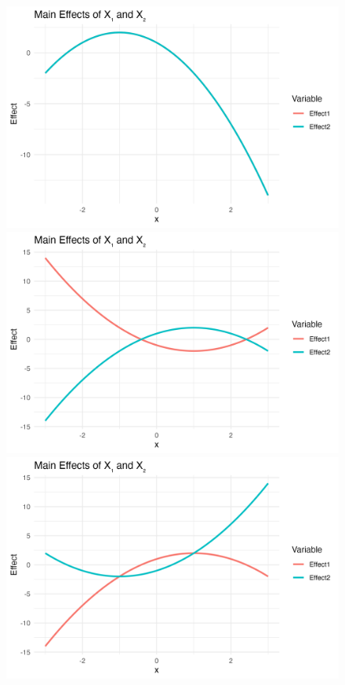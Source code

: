 \begin{figure}[htpb]
    \centering
    \begin{minipage}[t]{0.49\textwidth}
        \centering
        \includegraphics[width=\textwidth]{images/mixed_a1m20_a2m20_a11m10_a22m10_a12p00_rhop00_main.png}
    \end{minipage}
    \hfill
    \begin{minipage}[t]{0.49\textwidth}
        \centering
        \includegraphics[width=\textwidth]{images/mixed_a1m20_a2p20_a11p10_a22m10_a12p00_rhop00_main.png}
    \end{minipage}
    \hfill
    \begin{minipage}[t]{0.49\textwidth}
        \centering
        \includegraphics[width=\textwidth]{images/mixed_a1p20_a2p20_a11m10_a22p10_a12p00_rhop00_main.png}

\end{minipage}
\end{figure}
